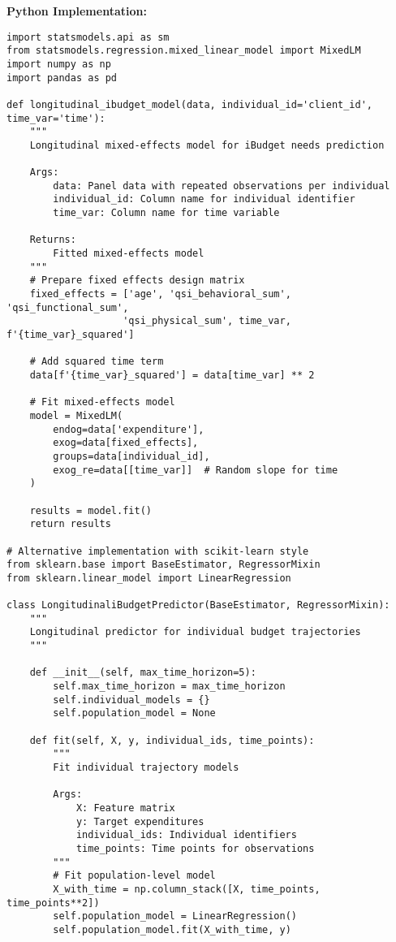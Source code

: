 \textbf{Python Implementation:}
\begin{lstlisting}
import statsmodels.api as sm
from statsmodels.regression.mixed_linear_model import MixedLM
import numpy as np
import pandas as pd

def longitudinal_ibudget_model(data, individual_id='client_id', time_var='time'):
    """
    Longitudinal mixed-effects model for iBudget needs prediction
    
    Args:
        data: Panel data with repeated observations per individual
        individual_id: Column name for individual identifier
        time_var: Column name for time variable
    
    Returns:
        Fitted mixed-effects model
    """
    # Prepare fixed effects design matrix
    fixed_effects = ['age', 'qsi_behavioral_sum', 'qsi_functional_sum', 
                    'qsi_physical_sum', time_var, f'{time_var}_squared']
    
    # Add squared time term
    data[f'{time_var}_squared'] = data[time_var] ** 2
    
    # Fit mixed-effects model
    model = MixedLM(
        endog=data['expenditure'],
        exog=data[fixed_effects],
        groups=data[individual_id],
        exog_re=data[[time_var]]  # Random slope for time
    )
    
    results = model.fit()
    return results

# Alternative implementation with scikit-learn style
from sklearn.base import BaseEstimator, RegressorMixin
from sklearn.linear_model import LinearRegression

class LongitudinaliBudgetPredictor(BaseEstimator, RegressorMixin):
    """
    Longitudinal predictor for individual budget trajectories
    """
    
    def __init__(self, max_time_horizon=5):
        self.max_time_horizon = max_time_horizon
        self.individual_models = {}
        self.population_model = None
        
    def fit(self, X, y, individual_ids, time_points):
        """
        Fit individual trajectory models
        
        Args:
            X: Feature matrix
            y: Target expenditures
            individual_ids: Individual identifiers
            time_points: Time points for observations
        """
        # Fit population-level model
        X_with_time = np.column_stack([X, time_points, time_points**2])
        self.population_model = LinearRegression()
        self.population_model.fit(X_with_time, y)
        

\end{lstlisting}

